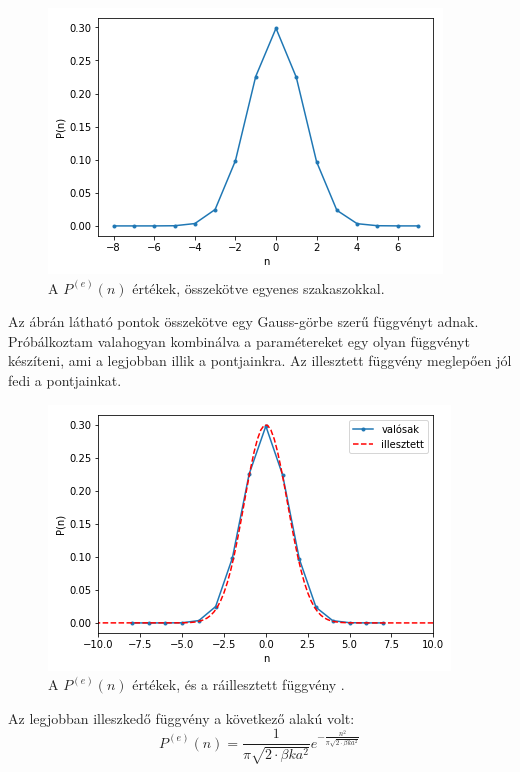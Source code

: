 \documentclass[12pt]{article}
\begin{document}
\begin{figure}[H]
\centering
\includegraphics[width = 80 mm]{pn}
\caption{A $P^{(e)}(n)$ értékek, összekötve egyenes szakaszokkal.}
\end{figure}

Az ábrán látható pontok összekötve egy Gauss-görbe szerű függvényt adnak. Próbálkoztam valahogyan kombinálva a paramétereket egy olyan függvényt készíteni, ami a legjobban illik a pontjainkra.
Az illesztett függvény meglepően jól fedi a pontjainkat.
\begin{figure}[H]
\centering
\includegraphics[width = 80 mm]{pnill}
\caption{A $P^{(e)}(n)$ értékek, és a ráillesztett függvény .}
\end{figure}


Az legjobban illeszkedő függvény a következő alakú volt:
$$P^{(e)}(n) = \frac{1}{\pi\sqrt{2\cdot \beta k a^2}}e^{-\frac{n^2}{\pi\sqrt{2\cdot \beta k a^2}}}$$
\end{document}
